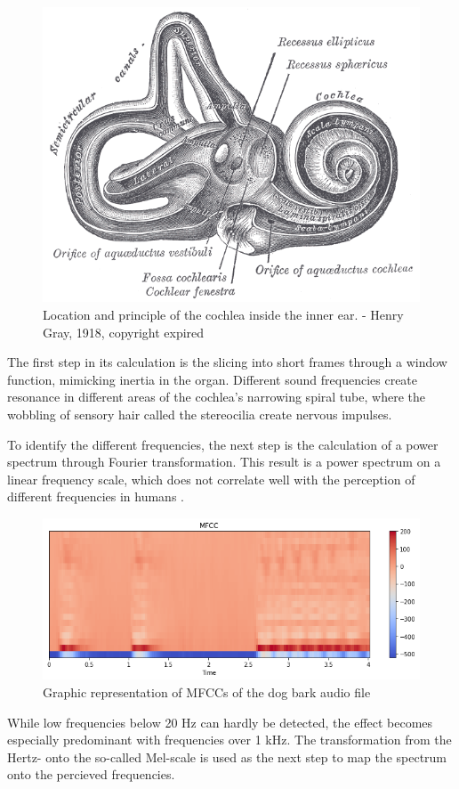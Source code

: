 \begin{figure}[h]
    \centering
	\includegraphics[width=.7\textwidth]{./images/illustrations/Gray921}
    \caption{Location and principle of the cochlea inside the inner ear. - Henry Gray, 1918, copyright expired}
    \label{fig:gray}
\end{figure}


The first step in its calculation is the slicing into short frames through a window function, mimicking inertia in the organ. Different sound frequencies create resonance in different areas of the cochlea’s narrowing spiral tube, where the wobbling of sensory hair called the stereocilia create nervous impulses.

To identify the different frequencies, the next step is the calculation of a power spectrum through Fourier transformation. This result is a power spectrum on a linear frequency scale, which does not correlate well with the perception of different frequencies in humans \cite{mel}. 

  \begin{figure}[h]
    \centering
	\includegraphics[width=.6\textwidth]{./images/illustrations/mfcc}
    \caption{Graphic representation of MFCCs of the dog bark audio file}
    \label{fig:mfcc}
\end{figure}
 
 
 While low frequencies below 20 Hz can hardly be detected, the effect becomes especially predominant with frequencies over 1 kHz. The transformation from the Hertz- onto the so-called Mel-scale is used as the next step to map the spectrum onto the percieved frequencies. 
 
